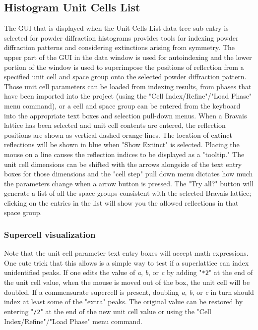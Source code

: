 \subsection{Histogram Unit Cells List}
The GUI that is displayed when the Unit Cells List data tree sub-entry is selected for powder diffraction histograms provides tools for indexing powder diffraction patterns and considering extinctions arising from symmetry. The upper part of the GUI in the data window is used for autoindexing and the lower portion of the window is used to superimpose the positions of reflection from a specified unit cell and space group onto the selected powder diffraction pattern. Those unit cell parameters can be loaded from indexing results, from phases that have been imported into the project (using the "Cell Index/Refine"/"Load Phase" menu command), or a cell and space group can be entered from the keyboard into the appropriate text boxes and selection pull-down menus. When a Bravais lattice has been selected and unit cell contents are entered, the reflection positions are shown as vertical dashed orange lines. The location of extinct reflections will be shown in blue when "Show Extinct" is selected. Placing the mouse on a line causes the reflection indices to be displayed as a "tooltip." The unit cell dimensions can be shifted with the arrows alongside of the text entry boxes for those dimensions and the "cell step" pull down menu dictates how much the parameters change when a arrow button is pressed. The "Try all?" button will generate a list of all the space groups consistent with the selected Bravais lattice; clicking on the entries in the list will show you the allowed reflections in that space group. 

\subsubsection{Supercell visualization}
\label{ref:supercellindexing}
Note that the unit cell parameter text entry boxes will accept math expressions. One cute trick that this allows is a simple way to test if a superlattice can index unidentified peaks. If one edits the value of \textit{a},  \textit{b}, or \textit{c} by adding "\texttt{*2}" at the end of the unit cell value, when the mouse is moved out of the box, the unit cell will be doubled. If a commensurate supercell is present, doubling \textit{a},  \textit{b}, or \textit{c} in turn should index at least some of the "extra" peaks. The original value can be restored by entering "\texttt{/2}" at the end of the new unit cell value or using the "Cell Index/Refine"/"Load Phase" menu command. 

